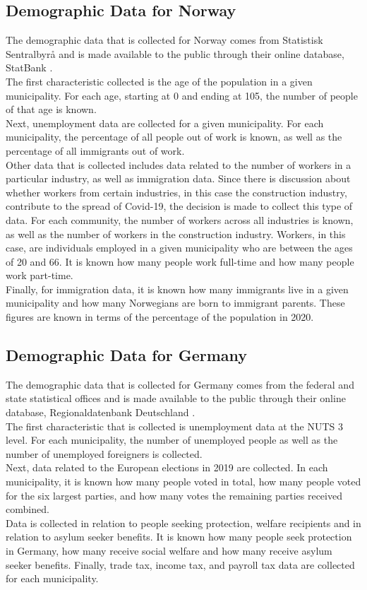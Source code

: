\subsection{Demographic Data for Norway}
The demographic data that is collected for Norway comes from Statistisk Sentralbyrå and is made available to the public through their online database, StatBank \autocite[][]{ssb}. \\
The first characteristic collected is the age of the population in a given municipality. For each age, starting at 0 and ending at 105, the number of people of that age is known. \\
Next, unemployment data are collected for a given municipality. For each municipality, the percentage of all people out of work is known, as well as the percentage of all immigrants out of work. \\
Other data that is collected includes data related to the number of workers in a particular industry, as well as immigration data. Since there is discussion about whether workers from certain industries, in this case the construction industry, contribute to the spread of Covid-19, the decision is made to collect this type of data. For each community, the number of workers across all industries is known, as well as the number of workers in the construction industry. Workers, in this case, are individuals employed in a given municipality who are between the ages of 20 and 66. It is known how many people work full-time and how many people work part-time. \\
Finally, for immigration data, it is known how many immigrants live in a given municipality and how many Norwegians are born to immigrant parents. These figures are known in terms of the percentage of the population in 2020.
\subsection{Demographic Data for Germany}
The demographic data that is collected for Germany comes from the federal and state statistical offices and is made available to the public through their online database, Regionaldatenbank Deutschland \autocite[][]{rdb}. \\
The first characteristic that is collected is unemployment data at the NUTS 3 level. For each municipality, the number of unemployed people as well as the number of unemployed foreigners is collected. \\
Next, data related to the European elections in 2019 are collected. In each municipality, it is known how many people voted in total, how many people voted for the six largest parties, and how many votes the remaining parties received combined. \\
Data is collected in relation to people seeking protection, welfare recipients and in relation to asylum seeker benefits. It is known how many people seek protection in Germany, how many receive social welfare and how many receive asylum seeker benefits. Finally, trade tax, income tax, and payroll tax data are collected for each municipality. 
\clearpage
